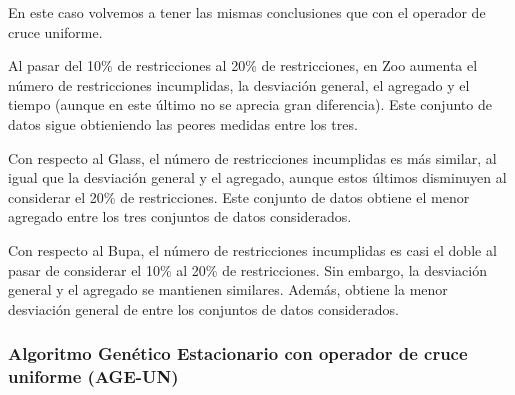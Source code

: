 En este caso volvemos a tener las mismas conclusiones que con el operador de cruce uniforme.

Al pasar del 10\% de restricciones al 20\% de restricciones, en Zoo aumenta el número de restricciones incumplidas, la desviación general, el agregado y el tiempo (aunque en este último no se aprecia gran diferencia).
Este conjunto de datos sigue obtieniendo las peores medidas entre los tres.

Con respecto al Glass, el número de restricciones incumplidas es más similar, al igual que la desviación general y el agregado, aunque estos últimos disminuyen al considerar el 20\% de restricciones.
Este conjunto de datos obtiene el menor agregado entre los tres conjuntos de datos considerados.

Con respecto al Bupa, el número de restricciones incumplidas es casi el doble al pasar de considerar el 10\% al 20\% de restricciones. Sin embargo, la desviación general y el agregado se mantienen similares. 
Además, obtiene la menor desviación general de entre los conjuntos de datos considerados.

\subsubsection{Algoritmo Genético Estacionario con operador de cruce uniforme (AGE-UN)}

